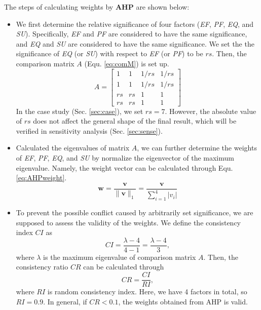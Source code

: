 \documentclass[12pt]{article}
\begin{document}
The steps of calculating weights by \textbf{AHP} are shown below:
\begin{itemize}
    \item We first determine the relative significance of four factors (\textit{EF}, \textit{PF}, \textit{EQ}, and \textit{SU}). Specifically, \textit{EF} and \textit{PF} are considered to have the same significance, and \textit{EQ} and \textit{SU} are considered to have the same significance. We set the the significance of \textit{EQ} (or \textit{SU}) with respect to \textit{EF} (or \textit{PF}) to be $rs$. Then, the comparison matrix $A$ (Equ. \eqref{eq:comM}) is set up.
    \begin{equation}
        A=\left[\begin{array}{cccc}
        1 & 1 & 1/rs & 1/rs \\
        1 & 1 & 1/rs & 1/rs \\
        rs & rs & 1 & 1     \\
        rs & rs & 1 & 1
        \end{array}\right]
        \label{eq:comM}
    \end{equation}
    In the case study (Sec. \ref{sec:case}), we set $rs = 7$. However, the absolute value of $rs$ does not affect the general shape of the final result, which will be verified in sensitivity analysis (Sec. \ref{sec:sense}).
    \item Calculated the eigenvalues of matrix $A$, we can further determine the weights of \textit{EF}, \textit{PF}, \textit{EQ}, and \textit{SU} by normalize the eigenvector of the maximum eigenvalue. Namely, the weight vector can be calculated through Equ. \eqref{eq:AHPweight}.
    \begin{equation}
        \mathbf{w} = \frac{\mathbf{v}}{\|\mathbf{v}\|_1} = \frac{\mathbf{v}}{\sum_{i=1}^4|v_i|}
        \label{eq:AHPweight}
    \end{equation}
    \item To prevent the possible conflict caused by arbitrarily set significance, we are supposed to assess the validity of the weights. We define the consistency index $CI$ as
    \begin{equation}
        CI = \frac{\lambda - 4}{4-1} = \frac{\lambda - 4}{3},
    \end{equation}
    where $\lambda$ is the maximum eigenvalue of comparison matrix $A$. Then, the consistency ratio $CR$ can be calculated through
    \begin{equation}
        CR = \frac{CI}{RI},
    \end{equation}
    where $RI$ is random consistency index. Here, we have 4 factors in total, so $RI=0.9$. In general, if $CR<0.1$, the weights obtained from AHP is valid.
\end{itemize}
\end{document}
